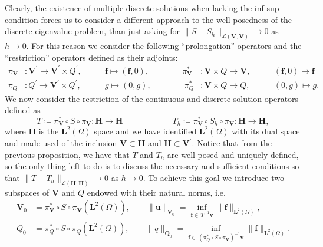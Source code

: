 \documentclass[USenglish]{article}
\theoremstyle{dgthm}
\theoremstyle{dgdef}
\let\vec\bm
\newcommand\norm[1]{\lVert#1\rVert}
\begin{document}
Clearly, the existence of multiple discrete solutions when lacking the inf-sup condition forces us to consider a different approach to the well-posedness of the discrete eigenvalue problem, than just asking for $\norm{S-S_h}_{\mathcal{L}(\vec{V},\vec{V})}\to 0$ as $h\to 0$.
For this reason we consider the following ``prolongation'' operators and the ``restriction'' operators defined as their adjoints:
\begin{equation}
  \begin{aligned}
    \pi_{\vec{V}}&:\vec{V}^\prime \to \vec{V}^\prime\times Q^\prime, \qquad &\vec{f}\mapsto (\vec{f},0),  \qquad\qquad \pi_{\vec{V}}^\ast&:\vec{V}\times Q \to \vec{V}, \qquad &(\vec{f},0) \mapsto \vec{f}\\ 
    \pi_{Q}&:Q^\prime \to \vec{V}^\prime\times Q^\prime, \qquad &g\mapsto (0,g),  \qquad\qquad \pi_{Q}^\ast&:\vec{V}\times Q \to Q, \qquad &(0,g) \mapsto g.
  \end{aligned}
\end{equation}
We now consider the restriction of the continuous and discrete solution operators defined as
\begin{equation}
  T\coloneqq \pi_{\vec{V}}^\ast\circ S\circ \pi_{\vec{V}}:\vec{H}\to \vec{H} \qquad \qquad \qquad T_h\coloneqq \pi_{\vec{V}}^\ast\circ S_h\circ \pi_{\vec{V}}:\vec{H} \to \vec{H}, 
\end{equation}
where $\vec{H}$ is the $\vec{L}^2(\Omega)$ space and we have identified $\vec{L}^2(\Omega)$ with its dual space and made used of the inclusion $\vec{V}\subset \vec{H}$ and $\vec{H}\subset \vec{V}^\prime$.
Notice that from the previous proposition, we have that $T$ and $T_h$ are well-posed and uniquely defined, so the only thing left to do is to discuss the necessary and sufficient conditions so that $\norm{T-T_h}_{\mathcal{L}(\vec{H},\vec{H})}\to 0$ as $h\to 0$.
To achieve this goal we introduce two subspaces of $\vec{V}$ and $Q$ endowed with their natural norms, i.e.
\begin{equation}
  \begin{aligned}
    \vec{V}_0 &= \pi_{\vec{V}}^\ast\circ S\circ \pi_{\vec{V}}\left(\vec{L}^2(\Omega)\right), \qquad \norm{\vec{u}}_{\vec{V}_0} = \underset{\vec{f}\in\, T^{-1}\vec{v}}{\inf}\norm{\vec{f}}_{\vec{L}^2(\Omega)},\\
    Q_0 &= \pi_{Q}^\ast\circ S\circ \pi_{Q}\left(\vec{L}^2(\Omega)\right), \qquad \norm{q}_{\vec{Q}_0} = \underset{\vec{f}\in\, (\pi_Q^\ast \circ S \circ \pi_{\vec{V}})^{-1}\vec{v}}{\inf}\norm{\vec{f}}_{\vec{L}^2(\Omega)}.
  \end{aligned}
\end{equation}
\end{document}
